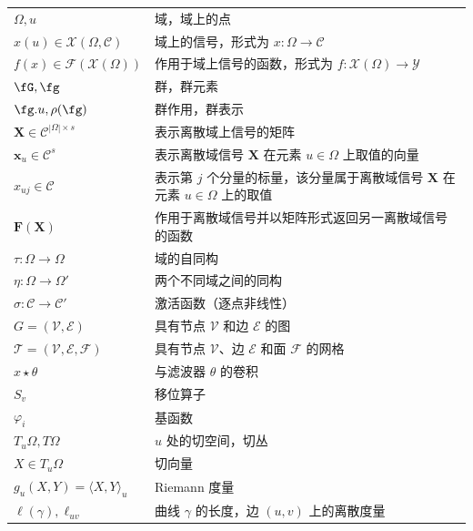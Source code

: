 \documentclass[11pt]{book}              %
\renewcommand\vec{\mathbf}
\begin{document}
\begin{minipage}{\textwidth}
\def\arraystretch{1.5}
\begin{tabular}{lp{3.25in}}
$\Omega,u$ & 域，域上的点\\
$x(u) \in \mathcal{X}(\Omega,\mathcal{C})$ & 域上的信号，形式为 $x:\Omega\rightarrow \mathcal{C}$\\
$f(x) \in \mathcal{F}(\mathcal{X}(\Omega))$ & 作用于域上信号的函数，形式为 $f:\mathcal{X}(\Omega) \rightarrow \mathcal{Y}$\\
%
$\fG,\fg$ & 群，群元素\\
$\fg.u, \rho(\fg)$ & 群作用，群表示\\
%
$\vec{X}\in\mathcal{C}^{|\Omega|\times s}$ & 表示离散域上信号的矩阵\\
$\vec{x}_u\in\mathcal{C}^{s}$ & 表示离散域信号 $\vec{X}$ 在元素 $u\in\Omega$ 上取值的向量\\
$x_{uj}\in\mathcal{C}$ & 表示第 $j$ 个分量的标量，该分量属于离散域信号 $\vec{X}$ 在元素 $u\in\Omega$ 上的取值\\
$\vec{F}(\vec{X})$ & 作用于离散域信号并以矩阵形式返回另一离散域信号的函数\\
%
$\tau:\Omega\rightarrow\Omega$ & 域的自同构\\
$\eta:\Omega\rightarrow\Omega'$ & 两个不同域之间的同构\\
$\sigma: \mathcal{C}\rightarrow\mathcal{C}'$ & 激活函数（逐点非线性）\\
%
$G=(\mathcal{V},\mathcal{E})$ & 具有节点 $\mathcal{V}$ 和边 $\mathcal{E}$ 的图\\
$\mathcal{T}=(\mathcal{V},\mathcal{E},\mathcal{F})$ & 具有节点 $\mathcal{V}$、边 $\mathcal{E}$ 和面 $\mathcal{F}$ 的网格\\
%
$x\star \theta$ & 与滤波器 $\theta$ 的卷积\\
$S_v$ & 移位算子\\
%
$\varphi_i$ & 基函数\\
%
%
$T_u\Omega, T\Omega$ & $u$ 处的切空间，切丛\\
$X \in T_u\Omega$ & 切向量\\
$g_u(X,Y) = \langle X, Y\rangle_u$ & Riemann 度量\\
%
$\ell(\gamma), \ell_{uv}$ & 曲线 $\gamma$ 的长度，边 $(u,v)$ 上的离散度量\\

\end{tabular}
\end{minipage}
\pagebreak



\renewcommand{\appendixname}{附录}
\appendix




\end{document}
